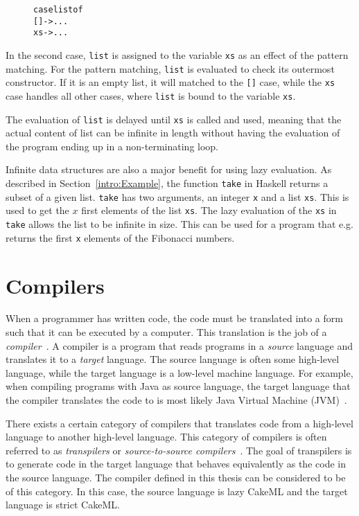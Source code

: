 \begin{figure}[H]
\begin{alltt}
  case list of
    [] -> ...
    xs -> ...
\end{alltt}
\end{figure}

\noindent In the second case, \texttt{list} is assigned to the variable
\texttt{xs} as an effect of the pattern matching. For the pattern matching,
\texttt{list} is evaluated to check its outermost constructor. If it is an empty
list, it will matched to the \texttt{[]} case, while the \texttt{xs} case
handles all other cases, where \texttt{list} is bound to the variable
\texttt{xs}.

The evaluation of
\texttt{list} is delayed until \texttt{xs} is called and used, meaning
that the actual content of list can be infinite in length without having the
evaluation of the program ending up in a non-terminating loop.

Infinite data structures are also a major benefit for using lazy evaluation.
As described in Section~\ref{intro:Example}, the function \texttt{take}
in Haskell returns a subset of a given list. \texttt{take} has two arguments,
an integer \texttt{x} and a list \texttt{xs}. This is used to get the
$x$ first elements of the list \texttt{xs}. The lazy evaluation of the
\texttt{xs} in \texttt{take} allows the list to be infinite in size. This
can be used for a program that e.g. returns the first \texttt{x} elements of
the Fibonacci numbers.


\section{Compilers}
When a programmer has written code, the code must be translated into a form such
that it can be executed by a computer. This translation is the job of a
\textit{compiler}~\cite{DragonBook}. A compiler is a program that reads
programs in a \textit{source} language and translates it to a \textit{target}
language. The source language is often some high-level language, while the
target language is a low-level machine language.
For example, when compiling programs with Java as source language, the target
language that the compiler translates the code to is most likely Java Virtual
Machine (JVM)~\cite{JavaJVM}.

There exists a certain category of compilers that translates code from a
high-level language to another high-level language. This category of compilers
is often referred to as \textit{transpilers} or
\textit{source-to-source compilers}~\cite{kulkarnitranspiler}.
The goal of transpilers is to generate code in the target language that behaves
equivalently as the code in the source language. The compiler defined in this %
thesis can be considered to be of this category. In this case, the source
language is lazy CakeML and the target language is strict CakeML.

